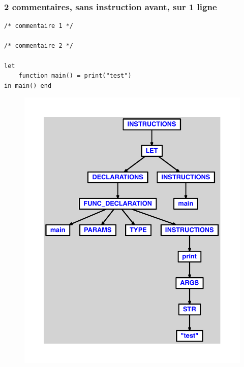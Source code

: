 \documentclass{article}
\begin{document}
\subsubsection{2 commentaires, sans instruction avant, sur 1 ligne}
\begin{lstlisting}
/* commentaire 1 */

/* commentaire 2 */

let
	function main() = print("test")
in main() end
\end{lstlisting}
\newpage
\begin{figure}[H]
\centering
\includegraphics[max width=\textwidth]{ast/ast_154.pdf}
\end{figure}
\newpage
\end{document}
